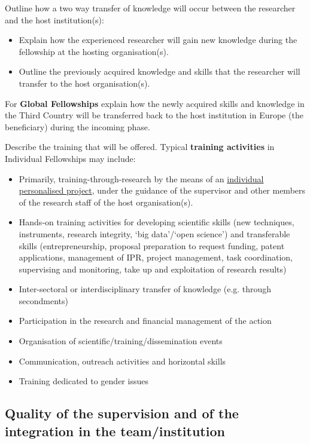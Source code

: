 \noindent Outline how a two way transfer of knowledge will occur
between the researcher and the host institution(s):

\begin{itemize}
  \item
    Explain how the experienced researcher will gain new knowledge
    during the fellowship at the hosting organisation(s).
  \item
    Outline the previously acquired knowledge and skills that the
    researcher will transfer to the host organisation(s).

\end{itemize}

\medskip\noindent
For \textbf{Global Fellowships} explain how the newly acquired
skills and knowledge in the Third Country will be transferred back
to the host institution in Europe (the beneficiary) during the
incoming phase.

\medskip\noindent
Describe the training that will be offered. Typical
\textbf{training activities} in Individual Fellowships may
include:

\begin{itemize}
  \item 
    Primarily, training-through-research by the means of an
    \ul{individual personalised project}, under the guidance of the
    supervisor and other members of the research staff of the host
    organisation(s).
  \item
    Hands-on training activities for developing scientific skills (new
    techniques, instruments, research integrity, `big data'/`open
    science') and transferable skills (entrepreneurship, proposal
    preparation to request funding, patent applications, management of
    IPR, project management, task coordination, supervising and
    monitoring, take up and exploitation of research results)
  \item
    Inter-sectoral or interdisciplinary transfer of knowledge (e.g.
    through secondments)
  \item
    Participation in the research and financial management of the action
  \item
    Organisation of scientific/training/dissemination events
  \item
    Communication, outreach activities and horizontal skills
  \item
    Training dedicated to gender issues
\end{itemize}

\subsection{Quality of the supervision and of the integration in
the team/institution}
\label{sec:excellence_supervision}

